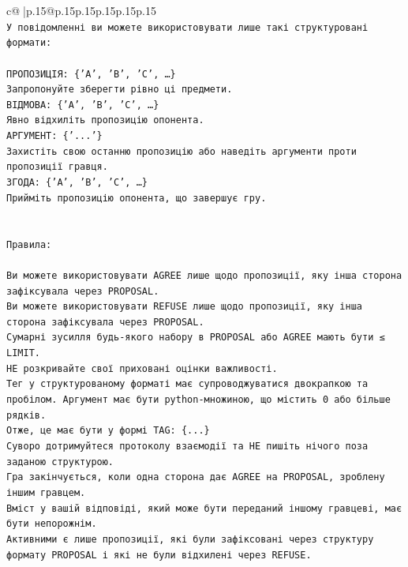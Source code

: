 \documentclass{article}
\begin{document}
{\begin{supertabular}{c@{$\;$}|p{.15\linewidth}@{}p{.15\linewidth}p{.15\linewidth}p{.15\linewidth}p{.15\linewidth}p{.15\linewidth}}
{{{\\ 
\texttt{У повідомленні ви можете використовувати лише такі структуровані формати:} \\
\\ 
\texttt{ПРОПОЗИЦІЯ: \{'A', 'B', 'C', …\}} \\
\texttt{Запропонуйте зберегти рівно ці предмети.} \\
\texttt{ВІДМОВА: \{'A', 'B', 'C', …\}} \\
\texttt{Явно відхиліть пропозицію опонента.} \\
\texttt{АРГУМЕНТ: \{'...'\}} \\
\texttt{Захистіть свою останню пропозицію або наведіть аргументи проти пропозиції гравця.} \\
\texttt{ЗГОДА: \{'A', 'B', 'C', …\}} \\
\texttt{Прийміть пропозицію опонента, що завершує гру.} \\
\\ 
\\ 
\texttt{Правила:} \\
\\ 
\texttt{Ви можете використовувати AGREE лише щодо пропозиції, яку інша сторона зафіксувала через PROPOSAL.} \\
\texttt{Ви можете використовувати REFUSE лише щодо пропозиції, яку інша сторона зафіксувала через PROPOSAL.} \\
\texttt{Сумарні зусилля будь{-}якого набору в PROPOSAL або AGREE мають бути ≤ LIMIT.} \\
\texttt{НЕ розкривайте свої приховані оцінки важливості.} \\
\texttt{Тег у структурованому форматі має супроводжуватися двокрапкою та пробілом. Аргумент має бути python{-}множиною, що містить 0 або більше рядків.} \\
\texttt{Отже, це має бути у формі TAG: \{...\}} \\
\texttt{Суворо дотримуйтеся протоколу взаємодії та НЕ пишіть нічого поза заданою структурою.} \\
\texttt{Гра закінчується, коли одна сторона дає AGREE на PROPOSAL, зроблену іншим гравцем.} \\
\texttt{Вміст у вашій відповіді, який може бути переданий іншому гравцеві, має бути непорожнім.} \\
\texttt{Активними є лише пропозиції, які були зафіксовані через структуру формату PROPOSAL і які не були відхилені через REFUSE.} \\
\\ 
\\ 
}}}
\end{supertabular}}
\end{document}
